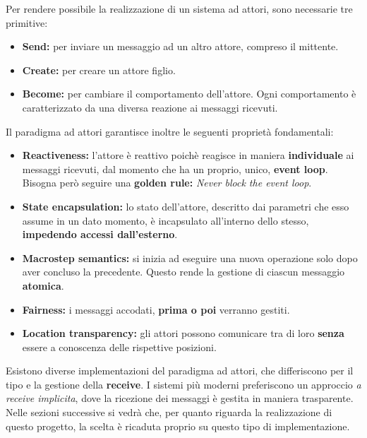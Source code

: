 	Per rendere possibile la realizzazione di un sistema ad attori, sono necessarie tre primitive:
	\begin{itemize}
		\item \textbf{Send:} per inviare un messaggio ad un altro attore, compreso il mittente.
		\item \textbf{Create:} per creare un attore figlio.
		\item \textbf{Become:} per cambiare il comportamento dell'attore. Ogni comportamento è caratterizzato da una diversa reazione ai messaggi ricevuti.
	\end{itemize}

	Il paradigma ad attori garantisce inoltre le seguenti proprietà fondamentali: 
	\begin{itemize}
		\item{\textbf{Reactiveness:}} l'attore è reattivo poichè reagisce in maniera \textbf{individuale} ai messaggi ricevuti, dal momento che ha un proprio, unico, \textbf{event loop}. Bisogna però seguire una \textbf{golden rule:} \emph{Never block the event loop}.
		\item{\textbf{State encapsulation:}} lo stato dell'attore, descritto dai parametri che esso assume in un dato momento, è incapsulato all'interno dello stesso, \textbf{impedendo accessi dall'esterno}. 
		\item{\textbf{Macrostep semantics:}} si inizia ad eseguire una nuova operazione solo dopo aver concluso la precedente. Questo rende la gestione di ciascun messaggio \textbf{atomica}.
		\item{\textbf{Fairness:}} i messaggi accodati, \textbf{prima o poi} verranno gestiti. 
		\item{\textbf{Location transparency:}} gli attori possono comunicare tra di loro \textbf{senza} essere a conoscenza delle rispettive posizioni.
	\end{itemize}

	Esistono diverse implementazioni del paradigma ad attori, che differiscono per il tipo e la gestione della \textbf{receive}. I sistemi più moderni preferiscono un approccio \textit{a receive implicita}, dove la ricezione dei messaggi è gestita in maniera trasparente. Nelle sezioni successive si vedrà che, per quanto riguarda la realizzazione di questo progetto, la scelta è ricaduta proprio su questo tipo di implementazione.


